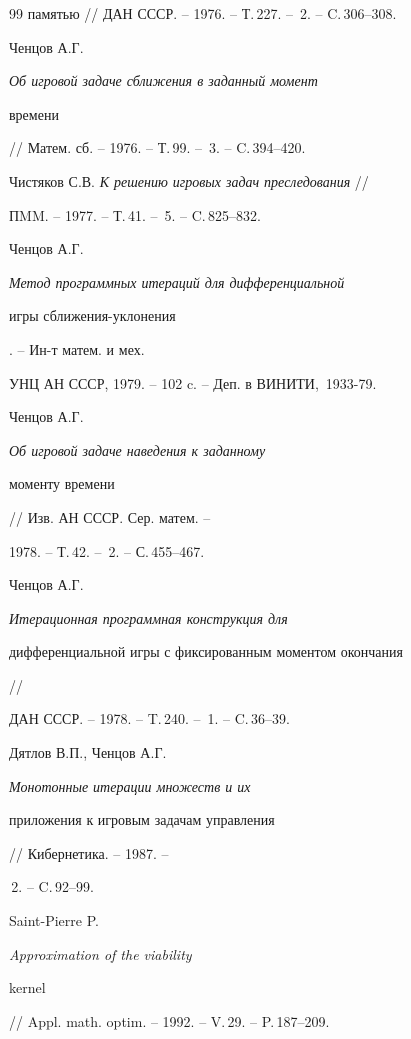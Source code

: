 \begin{thebibliography}{99}
{памятью} // ДАН СССР. -- 1976. -- Т.\,227. -- \No\,2. -- C.\,306--308.





 Ченцов А.Г. {\em Об игровой задаче сближения в заданный момент


времени} // Матем. сб. -- 1976. -- Т.\,99. -- \No\,3. -- C.\,394--420.





 Чистяков С.В. {\em К решению игровых задач преследования} //


ПMM. -- 1977. -- Т.\,41. -- \No\,5. -- C.\,825--832.





 Ченцов А.Г. {\em Метод программных итераций для дифференциальной


игры сближения-укло\-не\-ния}. -- Ин-т матем. и мех.


УНЦ АН СССР, 1979. -- 102 c. -- Деп. в ВИНИТИ, \No\,1933-79. 





 Ченцов А.Г. {\em Об игровой задаче наведения к заданному


моменту времени} // Изв. АН СССР. Сер. матем. --


1978. -- Т.\,42. -- \No\,2. -- С.\,455--467.





 Ченцов А.Г. {\em Итерационная программная конструкция для


дифференциальной игры с фиксированным моментом окончания} //


ДАН СССР. -- 1978. -- T.\,240. -- \No\,1. -- C.\,36--39.





 Дятлов В.П., Ченцов А.Г. {\em Монотонные итерации множеств и их


приложения к игровым задачам управления} // Кибернетика. -- 1987. --


\No\,2. -- C.\,92--99.





 Saint-Pierre P. {\em Approximation of the viability


kernel} // Appl. math. optim. -- 1992. -- V.\,29. -- P.\,187--209.






\end{thebibliography}
